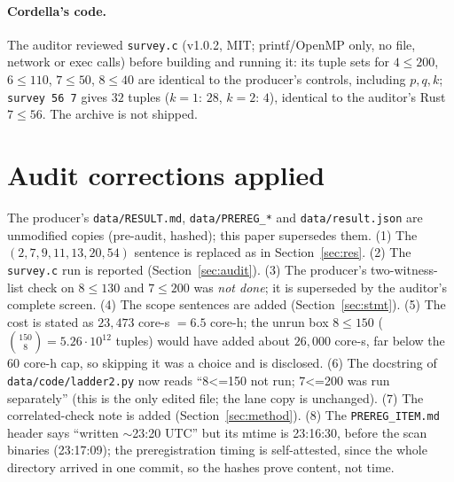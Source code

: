 \documentclass[10pt]{article}
\begin{document}
\paragraph{Cordella's code.} The auditor reviewed \texttt{survey.c} (v1.0.2, MIT; printf/OpenMP only, no file, network or exec calls) before building and running it: its tuple sets for $4\le200$, $6\le110$, $7\le50$, $8\le40$ are identical to the producer's controls, including $p,q,k$; \texttt{survey 56 7} gives $32$ tuples ($k=1$: $28$, $k=2$: $4$), identical to the auditor's Rust $7\le56$. The archive is not shipped.

\section{Audit corrections applied}\label{sec:corr}
The producer's \texttt{data/RESULT.md}, \texttt{data/PREREG\_*} and \texttt{data/result.json} are unmodified copies (pre-audit, hashed); this paper supersedes them. (1) The $(2,7,9,11,13,20,54)$ sentence is replaced as in Section~\ref{sec:res}. (2) The \texttt{survey.c} run is reported (Section~\ref{sec:audit}). (3) The producer's two-witness-list check on $8\le130$ and $7\le200$ was \emph{not done}; it is superseded by the auditor's complete screen. (4) The scope sentences are added (Section~\ref{sec:stmt}). (5) The cost is stated as $23{,}473$ core-s $=6.5$ core-h; the unrun box $8\le150$ ($\binom{150}{8}=5.26\cdot10^{12}$ tuples) would have added about $26{,}000$ core-s, far below the $60$ core-h cap, so skipping it was a choice and is disclosed. (6) The docstring of \texttt{data/code/ladder2.py} now reads ``8<=150 not run; 7<=200 was run separately'' (this is the only edited file; the lane copy is unchanged). (7) The correlated-check note is added (Section~\ref{sec:method}). (8) The \texttt{PREREG\_ITEM.md} header says ``written $\sim$23:20 UTC'' but its mtime is 23:16:30, before the scan binaries (23:17:09); the preregistration timing is self-attested, since the whole directory arrived in one commit, so the hashes prove content, not time.
\end{document}
